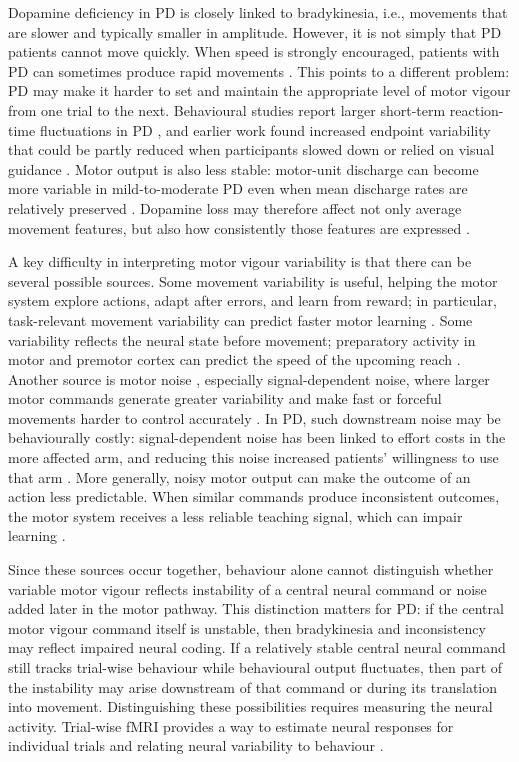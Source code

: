 \documentclass[utf8]{FrontiersinHarvard}
\begin{document}
Dopamine deficiency in PD is closely linked to bradykinesia, i.e., movements that are slower and typically smaller in amplitude. However, it is not simply that PD patients cannot move quickly. When speed is strongly encouraged, patients with PD can sometimes produce rapid movements \citep{mazzoni2007parkinson}. This points to a different problem: PD may make it harder to set and maintain the appropriate level of motor vigour from one trial to the next. Behavioural studies report larger short-term reaction-time fluctuations in PD \citep{macdonald2025capturing}, and earlier work found increased endpoint variability that could be partly reduced when participants slowed down or relied on visual guidance \citep{sheridan1990bradykinesia}. Motor output is also less stable: motor-unit discharge can become more variable in mild-to-moderate PD even when mean discharge rates are relatively preserved \citep{wilson2020motor}. Dopamine loss may therefore affect not only average movement features, but also how consistently those features are expressed \citep{lee2015dopamine}.

A key difficulty in interpreting motor vigour variability is that there can be several possible sources. Some movement variability is useful, helping the motor system explore actions, adapt after errors, and learn from reward; in particular, task-relevant movement variability can predict faster motor learning \citep{pekny2015reward,wu2014variability}. Some variability reflects the neural state before movement; preparatory activity in motor and premotor cortex can predict the speed of the upcoming reach \citep{churchland2006preparatory}. Another source is motor noise \citep{faisal2008noise}, especially signal-dependent noise, where larger motor commands generate greater variability and make fast or forceful movements harder to control accurately \citep{harris1998signal}. In PD, such downstream noise may be behaviourally costly: signal-dependent noise has been linked to effort costs in the more affected arm, and reducing this noise increased patients' willingness to use that arm \citep{salimpour2015altering}. More generally, noisy motor output can make the outcome of an action less predictable. When similar commands produce inconsistent outcomes, the motor system receives a less reliable teaching signal, which can impair learning \citep{therrien2016cerebellar}.


Since these sources occur together, behaviour alone cannot distinguish whether variable motor vigour reflects instability of a central neural command or noise added later in the motor pathway. This distinction matters for PD: if the central motor vigour command itself is unstable, then bradykinesia and inconsistency may reflect impaired neural coding. If a relatively stable central neural command still tracks trial-wise behaviour while behavioural output fluctuates, then part of the instability may arise downstream of that command or during its translation into movement. Distinguishing these possibilities requires measuring the neural activity. Trial-wise fMRI provides a way to estimate neural responses for individual trials \citep{mumford2012deconvolving,prince2022improving} and relating neural variability to behaviour \citep{garrett2013moment,haar2017individual}.
\end{document}
